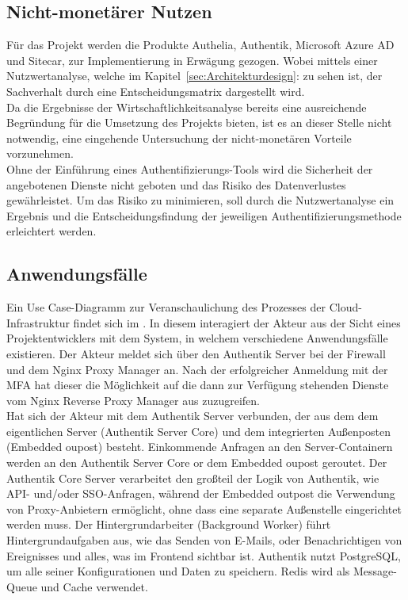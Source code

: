 \subsection{Nicht-monetärer Nutzen}
\label{sec:Nicht-monetärer Nutzen}
Für das Projekt werden die Produkte Authelia, Authentik, Microsoft Azure AD und Sitecar, zur Implementierung in Erwägung gezogen. 
Wobei mittels einer Nutzwertanalyse, welche im Kapitel~\ref{sec:Architekturdesign}:  zu sehen ist, der 
Sachverhalt durch eine Entscheidungsmatrix dargestellt wird.
\\Da die Ergebnisse der Wirtschaftlichkeitsanalyse bereits eine ausreichende Begründung für die Umsetzung des Projekts bieten, 
ist es an dieser Stelle nicht notwendig, eine eingehende Untersuchung der nicht-monetären Vorteile vorzunehmen.
\\Ohne der Einführung eines Authentifizierungs-Tools wird die Sicherheit der angebotenen Dienste nicht geboten und das Risiko des 
Datenverlustes gewährleistet. Um das Risiko zu minimieren, soll durch die Nutzwertanalyse ein Ergebnis und die Entscheidungsfindung 
der jeweiligen Authentifizierungsmethode erleichtert werden.


\subsection{Anwendungsfälle}
\label{sec:Anwendungsfaelle}
Ein Use Case-Diagramm zur Veranschaulichung des Prozesses der Cloud-Infrastruktur findet sich im .
In diesem interagiert der Akteur aus der Sicht eines Projektentwicklers mit dem System, in welchem verschiedene 
Anwendungsfälle existieren. Der Akteur meldet sich über den Authentik Server bei der Firewall und dem Nginx Proxy Manager an. 
Nach der erfolgreicher Anmeldung mit der \acs*{MFA} hat dieser die Möglichkeit auf die dann zur Verfügung stehenden Dienste vom 
Nginx Reverse Proxy Manager aus zuzugreifen.
\\Hat sich der Akteur mit dem Authentik Server verbunden, der aus dem dem eigentlichen Server (Authentik Server Core) und dem 
integrierten Außenposten (Embedded oupost) besteht. Einkommende Anfragen an den Server-Containern werden an den Authentik Server Core 
or dem Embedded oupost geroutet. Der Authentik Core Server verarbeitet den großteil der Logik von Authentik, wie \zB API- und/oder 
\acs*{SSO}-Anfragen, während der Embedded outpost die Verwendung von Proxy-Anbietern ermöglicht, ohne dass eine separate Außenstelle 
eingerichtet werden muss. Der Hintergrundarbeiter (Background Worker) führt Hintergrundaufgaben aus, wie das Senden von E-Mails, 
oder Benachrichtigen von Ereignisses und alles, was im Frontend sichtbar ist. Authentik nutzt PostgreSQL, um alle seiner 
Konfigurationen und Daten zu speichern. Redis wird als Message-Queue und Cache verwendet.